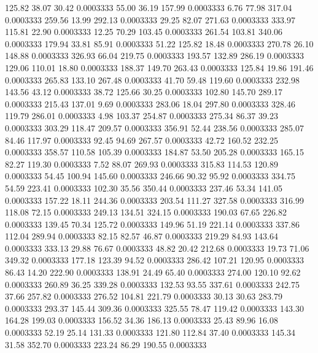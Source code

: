  125.82   38.07   30.42   0.0003333
  55.00   36.19  157.99   0.0003333
   6.76   77.98  317.04   0.0003333
 259.56   13.99  292.13   0.0003333
  29.25   82.07  271.63   0.0003333
 333.97  115.81   22.90   0.0003333
  12.25   70.29  103.45   0.0003333
 261.54  103.81  340.06   0.0003333
 179.94   33.81   85.91   0.0003333
  51.22  125.82   18.48   0.0003333
 270.78   26.10  148.88   0.0003333
 326.93   66.04  219.75   0.0003333
 193.57  132.89  286.19   0.0003333
 129.06  110.01   18.80   0.0003333
 188.37  149.70  263.43   0.0003333
 125.84   19.86  191.46   0.0003333
 265.83  133.10  267.48   0.0003333
  41.70   59.48  119.60   0.0003333
 232.98  143.56   43.12   0.0003333
  38.72  125.66   30.25   0.0003333
 102.80  145.70  289.17   0.0003333
 215.43  137.01    9.69   0.0003333
 283.06   18.04  297.80   0.0003333
 328.46  119.79  286.01   0.0003333
   4.98  103.37  254.87   0.0003333
 275.34   86.37   39.23   0.0003333
 303.29  118.47  209.57   0.0003333
 356.91   52.44  238.56   0.0003333
 285.07   84.46  117.97   0.0003333
  92.45   94.69  267.57   0.0003333
  42.72  160.52  232.25   0.0003333
 358.57  110.58  105.39   0.0003333
 184.87   53.50  205.28   0.0003333
 165.15   82.27  119.30   0.0003333
   7.52   88.07  269.93   0.0003333
 315.83  114.53  120.89   0.0003333
  54.45  100.94  145.60   0.0003333
 246.66   90.32   95.92   0.0003333
 334.75   54.59  223.41   0.0003333
 102.30   35.56  350.44   0.0003333
 237.46   53.34  141.05   0.0003333
 157.22   18.11  244.36   0.0003333
 203.54  111.27  327.58   0.0003333
 316.99  118.08   72.15   0.0003333
 249.13  134.51  324.15   0.0003333
 190.03   67.65  226.82   0.0003333
 139.45   70.34  125.72   0.0003333
 149.96   51.19  221.14   0.0003333
 337.86  112.04  289.94   0.0003333
  82.15   82.57   46.87   0.0003333
 219.29   84.93  143.64   0.0003333
 333.13   29.88   76.67   0.0003333
  48.82   20.42  212.68   0.0003333
  19.73   71.06  349.32   0.0003333
 177.18  123.39   94.52   0.0003333
 286.42  107.21  120.95   0.0003333
  86.43   14.20  222.90   0.0003333
 138.91   24.49   65.40   0.0003333
 274.00  120.10   92.62   0.0003333
 260.89   36.25  339.28   0.0003333
 132.53   93.55  337.61   0.0003333
 242.75   37.66  257.82   0.0003333
 276.52  104.81  221.79   0.0003333
  30.13   30.63  283.79   0.0003333
 293.37  145.44  309.36   0.0003333
 325.55   78.47  119.42   0.0003333
 143.30  164.28  199.03   0.0003333
 156.52   34.36  186.13   0.0003333
  25.43   89.96   16.08   0.0003333
  52.19   25.14  131.33   0.0003333
 121.80  112.84   37.40   0.0003333
 145.34   31.58  352.70   0.0003333
 223.24   86.29  190.55   0.0003333
